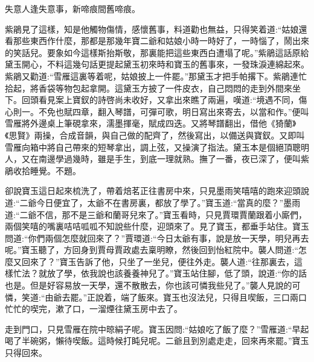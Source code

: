 \begin{poem}
    \begin{pl}
        失意人逢失意事，新啼痕間舊啼痕。
    \end{pl}
\end{poem}


\begin{parag}
    紫鵑見了這樣，知是他觸物傷情，感懷舊事，料道勸也無益，只得笑着道:“姑娘還看那些東西作什麼，那都是那幾年寶二爺和姑娘小時一時好了，一時惱了，鬧出來的笑話兒。要象如今這樣斯抬斯敬，那裏能把這些東西白遭塌了呢。”紫鵑這話原給黛玉開心，不料這幾句話更提起黛玉初來時和寶玉的舊事來，一發珠淚連綿起來。紫鵑又勸道:“雪雁這裏等着呢，姑娘披上一件罷。”那黛玉才把手帕撂下。紫鵑連忙拾起，將香袋等物包起拿開。這黛玉方披了一件皮衣，自己悶悶的走到外間來坐下。回頭看見案上寶釵的詩啓尚未收好，又拿出來瞧了兩遍，嘆道:“境遇不同，傷心則一。不免也賦四章，翻入琴譜，可彈可歌，明日寫出來寄去，以當和作。”便叫雪雁將外邊桌上筆硯拿來，濡墨揮毫，賦成四迭。又將琴譜翻出，借他《猗蘭》《思賢》兩操，合成音韻，與自己做的配齊了，然後寫出，以備送與寶釵。又即叫雪雁向箱中將自己帶來的短琴拿出，調上弦，又操演了指法。黛玉本是個絕頂聰明人，又在南邊學過幾時，雖是手生，到底一理就熟。撫了一番，夜已深了，便叫紫鵑收拾睡覺。不題。
\end{parag}


\begin{parag}
    卻說寶玉這日起來梳洗了，帶着焙茗正往書房中來，只見墨雨笑嘻嘻的跑來迎頭說道:“二爺今日便宜了，太爺不在書房裏，都放了學了。”寶玉道:“當真的麼？”墨雨道:“二爺不信，那不是三爺和蘭哥兒來了。”寶玉看時，只見賈環賈蘭跟着小廝們，兩個笑嘻的嘴裏咭咭呱呱不知說些什麼，迎頭來了。見了寶玉，都垂手站住。寶玉問道:“你們兩個怎麼就回來了？”賈環道:“今日太爺有事，說是放一天學，明兒再去呢。”寶玉聽了，方回身到賈母賈政處去稟明瞭，然後回到怡紅院中。襲人問道:“怎麼又回來了？”寶玉告訴了他，只坐了一坐兒，便往外走。襲人道:“往那裏去，這樣忙法？就放了學，依我說也該養養神兒了。”寶玉站住腳，低了頭，說道:“你的話也是。但是好容易放一天學，還不散散去，你也該可憐我些兒了。”襲人見說的可憐，笑道:“由爺去罷。”正說着，端了飯來。寶玉也沒法兒，只得且喫飯，三口兩口忙忙的喫完，漱了口，一溜煙往黛玉房中去了。
\end{parag}


\begin{parag}
    走到門口，只見雪雁在院中晾絹子呢。寶玉因問:“姑娘吃了飯了麼？”雪雁道:“早起喝了半碗粥，懶待喫飯。這時候打盹兒呢。二爺且到別處走走，回來再來罷。”寶玉只得回來。
\end{parag}


